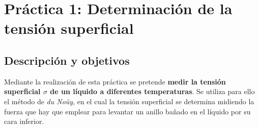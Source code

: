 \documentclass[12pt,a4paper]{article}
\begin{document}


\vspace{-1cm}
\section*{Práctica 1: Determinación de la tensión superficial}

\subsection*{Descripción y objetivos}
Mediante la realización de esta práctica se pretende \textbf{medir la tensión superficial $\sigma$ de un líquido a diferentes temperaturas}. Se utiliza para ello el método de \emph{du Noüy}, en el cual la tensión superficial se determina midiendo la fuerza que hay que emplear para levantar un anillo bañado en el líquido por su cara inferior.
\end{document}
